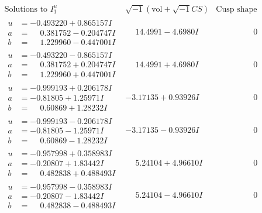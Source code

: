 \documentclass[1p]{elsarticle_modified}
\theoremstyle{definition}
\newcommand{\I}{\sqrt{-1}}
\begin{document}
$$\begin{array}{c|c|c}  
\text{Solutions to }I^u_{1}& \I (\text{vol} + \sqrt{-1}CS) & \text{Cusp shape}\\
 \hline 
\begin{aligned}
u &= -0.493220 + 0.865157 I \\
a &= \phantom{-}0.381752 - 0.204747 I \\
b &= \phantom{-}1.229960 - 0.447001 I\end{aligned}
 & \phantom{-}14.4991 - 4.6980 I & \phantom{-0.000000 } 0 \\ \hline\begin{aligned}
u &= -0.493220 - 0.865157 I \\
a &= \phantom{-}0.381752 + 0.204747 I \\
b &= \phantom{-}1.229960 + 0.447001 I\end{aligned}
 & \phantom{-}14.4991 + 4.6980 I & \phantom{-0.000000 } 0 \\ \hline\begin{aligned}
u &= -0.999193 + 0.206178 I \\
a &= -0.81805 + 1.25971 I \\
b &= \phantom{-}0.60869 + 1.28232 I\end{aligned}
 & -3.17135 + 0.93926 I & \phantom{-0.000000 } 0 \\ \hline\begin{aligned}
u &= -0.999193 - 0.206178 I \\
a &= -0.81805 - 1.25971 I \\
b &= \phantom{-}0.60869 - 1.28232 I\end{aligned}
 & -3.17135 - 0.93926 I & \phantom{-0.000000 } 0 \\ \hline\begin{aligned}
u &= -0.957998 + 0.358983 I \\
a &= -0.20807 + 1.83442 I \\
b &= \phantom{-}0.482838 + 0.488493 I\end{aligned}
 & \phantom{-}5.24104 + 4.96610 I & \phantom{-0.000000 } 0 \\ \hline\begin{aligned}
u &= -0.957998 - 0.358983 I \\
a &= -0.20807 - 1.83442 I \\
b &= \phantom{-}0.482838 - 0.488493 I\end{aligned}
 & \phantom{-}5.24104 - 4.96610 I & \phantom{-0.000000 } 0 \\ \hline\begin{aligned}

\end{aligned}
\end{array}$$
\end{document}
